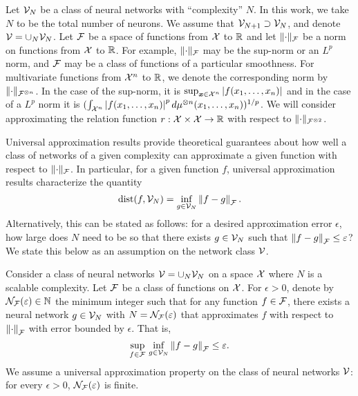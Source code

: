 Let ${\mathcal{V}}_N$ be a class of neural networks with ``complexity'' $N$. In this work, we take $N$ to be the total number of neurons. We assume that ${\mathcal{V}}_{N+1} \supset {\mathcal{V}}_N$, and denote ${\mathcal{V}} = \cup_N{{\mathcal{V}}_N}$. Let ${\mathcal{F}}$ be a space of functions from ${\mathcal{X}}$ to $\mathbb{R}$ and let $\lVert\cdot\rVert_{\mathcal{F}}$ be a norm on functions from ${\mathcal{X}}$ to $\mathbb{R}$. For example, $\lVert\cdot\rVert_{\mathcal{F}}$ may be the sup-norm or an $L^p$ norm, and ${\mathcal{F}}$ may be a class of functions of a particular smoothness. For multivariate functions from ${\mathcal{X}}^n$ to $\mathbb{R}$, we denote the corresponding norm by $\lVert\cdot\rVert_{{\mathcal{F}}^{\otimes n}}$. In the case of the sup-norm, it is $\sup_{\bm{x} \in {\mathcal{X}}^n} \left\lvert f(x_1, \ldots, x_n)\right\rvert$ and in the case of a $L^p$ norm it is $(\int_{{\mathcal{X}}^n} \left\lvert f(x_1, \ldots, x_n)\right\rvert^p d\mu^{\otimes n}(x_1, \ldots, x_n))^{1/p}$. We will consider approximating the relation function $r: {\mathcal{X}} \times {\mathcal{X}} \to \mathbb{R}$ with respect to $\lVert\cdot\rVert_{{\mathcal{F}}^{\otimes 2}}$.

Universal approximation results provide theoretical guarantees about how well a class of networks of a given complexity can approximate a given function with respect to $\lVert\cdot\rVert_{\mathcal{F}}$. In particular, for a given function $f$, universal approximation results characterize the quantity
\[\mathrm{dist}(f, {\mathcal{V}}_N) = \inf_{g \in {\mathcal{V}}_N} \left\lVert f - g\right\rVert_{{\mathcal{F}}}.\]
Alternatively, this can be stated as follows: for a desired approximation error $\epsilon$, how large does $N$ need to be so that there exists $g \in {\mathcal{V}}_N$ such that $\left\lVert f - g\right\rVert_{{\mathcal{F}}} \leq \varepsilon$? We state this below as an assumption on the network class ${\mathcal{V}}$.

\begin{assumption}\label{ass:univ_approx_efficiency}
	Consider a class of neural networks ${\mathcal{V}} = \cup_N {\mathcal{V}}_N$ on a space ${\mathcal{X}}$ where $N$ is a scalable complexity. Let ${\mathcal{F}}$ be a class of functions on ${\mathcal{X}}$. For $\epsilon > 0$, denote by ${\mathcal{N}}_{\mathcal{F}}(\varepsilon) \in \mathbb{N}$ the minimum integer such that for any function $f \in {\mathcal{F}}$, there exists a neural network $g \in {\mathcal{V}}_N$ with $N = {\mathcal{N}}_{\mathcal{F}}(\varepsilon)$ that approximates $f$ with respect to $\left\lVert\cdot\right\rVert_{\mathcal{F}}$ with error bounded by $\epsilon$. That is,
	\begin{equation*}
		\sup_{f \in {\mathcal{F}}} \, \inf_{g \in {\mathcal{V}}_N} \left\lVert f - g\right\rVert_{{\mathcal{F}}} \leq \varepsilon.
	\end{equation*}
	We assume a universal approximation property on the class of neural networks ${\mathcal{V}}$: for every $\epsilon > 0$, ${\mathcal{N}}_{\mathcal{F}}(\varepsilon)$ is finite.
\end{assumption}

